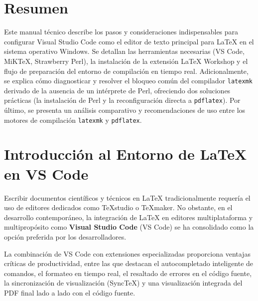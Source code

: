 \documentclass[
10pt, %
a4paper, %
oneside, %
headinclude,footinclude, %
BCOR5mm, %
]{scrartcl}
\begin{document}
\setcounter{tocdepth}{3}

\section*{Resumen}
Este manual técnico describe los pasos y consideraciones indispensables para configurar Visual Studio Code como el editor de texto principal para LaTeX en el sistema operativo Windows. Se detallan las herramientas necesarias (VS Code, MiKTeX, Strawberry Perl), la instalación de la extensión LaTeX Workshop y el flujo de preparación del entorno de compilación en tiempo real. Adicionalmente, se explica cómo diagnosticar y resolver el bloqueo común del compilador \texttt{latexmk} derivado de la ausencia de un intérprete de Perl, ofreciendo dos soluciones prácticas (la instalación de Perl y la reconfiguración directa a \texttt{pdflatex}). Por último, se presenta un análisis comparativo y recomendaciones de uso entre los motores de compilación \texttt{latexmk} y \texttt{pdflatex}.
\newpage

\tableofcontents %

\newpage

\section{Introducción al Entorno de LaTeX en VS Code}

Escribir documentos científicos y técnicos en LaTeX tradicionalmente requería el uso de editores dedicados como TeXstudio o TeXmaker. No obstante, en el desarrollo contemporáneo, la integración de LaTeX en editores multiplataforma y multipropósito como \textbf{Visual Studio Code} (VS Code) se ha consolidado como la opción preferida por los desarrolladores. 

La combinación de VS Code con extensiones especializadas proporciona ventajas críticas de productividad, entre las que destacan el autocompletado inteligente de comandos, el formateo en tiempo real, el resaltado de errores en el código fuente, la sincronización de visualización (SyncTeX) y una visualización integrada del PDF final lado a lado con el código fuente.
\end{document}
